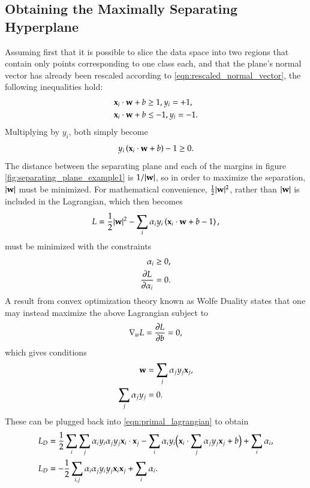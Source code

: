 \subsection{Obtaining the Maximally Separating Hyperplane}
Assuming first that it is possible to slice the data space into two regions that contain only points corresponding to one class each, and that the plane's normal vector has already been rescaled according to \eqref{eqn:rescaled_normal_vector}, the following inequalities hold:
\begin{equation}
	\begin{aligned}
		\mathbf{x}_i\cdot \mathbf{w} + b &\ge 1, y_i = +1, \\
		\mathbf{x}_i\cdot \mathbf{w} + b &\le -1, y_i = -1.
	\end{aligned} \label{eqn:dedersenslagrangebetingelserder}
\end{equation}
Multiplying by $y_i$, both simply become
\begin{equation}
	y_i\left( \mathbf{x}_i\cdot \mathbf{w} + b \right) - 1 \ge 0. \label{eqn:kombineret_lagrangeting}
\end{equation}
The distance between the separating plane and each of the margins in figure \ref{fig:separating_plane_example1} is $1/|\mathbf{w}|$, so in order to maximize the separation, $|\mathbf{w}|$ must be minimized. For mathematical convenience, $\frac{1}{2} |\mathbf{w}|^2$, rather than $|\mathbf{w}|$ is included in the Lagrangian, which then becomes
\begin{equation}
	L = \frac{1}{2} |\mathbf{w}|^2 - \sum_i \alpha_i y_i \left( \mathbf{x}_i\cdot \mathbf{w} + b - 1 \right), \label{eqn:primal_lagrangian}
\end{equation}
must be minimized with the constraints
\begin{align}
	\alpha_i &\ge 0, \\
	\pardiff{L}{\alpha_i} &= 0.
\end{align}
A result from convex optimization theory known as Wolfe Duality\cite{wolfe1961duality} states that one may instead maximize the above Lagrangian subject to
\begin{equation}
	\nabla_w L = \pardiff{L}{b} = 0,
\end{equation}
which gives conditions
\begin{align}
	\mathbf{w} &= \sum_j \alpha_jy_j\mathbf{x}_j, \\
	\sum_j \alpha_jy_j &= 0.
\end{align}
These can be plugged back into \eqref{eqn:primal_lagrangian} to obtain
\begin{align}
	L_D &= \frac{1}{2} \sum_i \sum_j \alpha_i y_i \alpha_j y_j \mathbf{x}_i \cdot \mathbf{x}_j
	- \sum_i \alpha_i y_i \big( \mathbf{x}_i \cdot \sum_j \alpha_j y_j \mathbf{x}_j + b \big) + \sum_i \alpha_i, \\
	L_D &= -\frac{1}{2} \sum_{i,j} \alpha_i \alpha_j y_i y_j \mathbf{x}_i \mathbf{x}_j + \sum_i \alpha_i. \label{eqn:dual_lagrangian}
\end{align}
